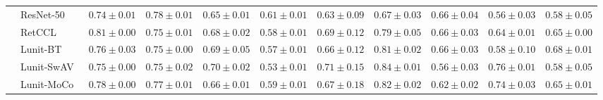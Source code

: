 \begin{tabular}{ll|cccc|c|cccc}
 & ResNet-50~\cite{he2015deep} & $0.74 \pm 0.01$ & $\mathbf{0.78 \pm 0.01}$ & $0.65 \pm 0.01$ & $0.61 \pm 0.01$ & $0.63 \pm 0.09$ & $0.67 \pm 0.03$ & $0.66 \pm 0.04$ & $0.56 \pm 0.03$ & $0.58 \pm 0.05$ \\
 & RetCCL~\cite{wang2023retccl} & $0.81 \pm 0.00$ & $0.75 \pm 0.01$ & $0.68 \pm 0.02$ & $0.58 \pm 0.01$ & $0.69 \pm 0.12$ & $0.79 \pm 0.05$ & $0.66 \pm 0.03$ & $0.64 \pm 0.01$ & $0.65 \pm 0.00$ \\
 & Lunit-BT~\cite{kang2023benchmarking} & $0.76 \pm 0.03$ & $0.75 \pm 0.00$ & $0.69 \pm 0.05$ & $0.57 \pm 0.01$ & $0.66 \pm 0.12$ & $0.81 \pm 0.02$ & $0.66 \pm 0.03$ & $0.58 \pm 0.10$ & $0.68 \pm 0.01$ \\
 & Lunit-SwAV~\cite{kang2023benchmarking} & $0.75 \pm 0.00$ & $0.75 \pm 0.02$ & $0.70 \pm 0.02$ & $0.53 \pm 0.01$ & $0.71 \pm 0.15$ & $0.84 \pm 0.01$ & $0.56 \pm 0.03$ & $0.76 \pm 0.01$ & $0.58 \pm 0.05$ \\
 & Lunit-MoCo~\cite{kang2023benchmarking} & $0.78 \pm 0.00$ & $0.77 \pm 0.01$ & $0.66 \pm 0.01$ & $0.59 \pm 0.01$ & $0.67 \pm 0.18$ & $0.82 \pm 0.02$ & $0.62 \pm 0.02$ & $0.74 \pm 0.03$ & $0.65 \pm 0.01$ \\
\cline{1-11}
\bottomrule
\end{tabular}
